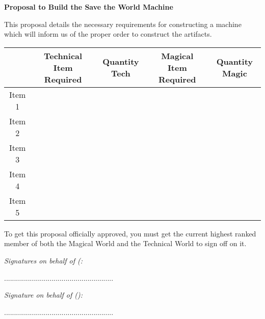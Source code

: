 \documentclass[white]{guildcamp3}
\begin{document}
\name{\wProposal{}} %
\large\textbf{Proposal to Build the Save the World Machine}  


This proposal details the necessary requirements for constructing a machine which will inform us of the proper order to construct the artifacts. 


\begin{tabular}{|c|c|c|c|c|}
	\hline \rule[-2ex]{0pt}{5.5ex}  & Technical Item Required & Quantity Tech & Magical Item Required & Quantity Magic \\ 
	\hline \rule[-2ex]{0pt}{5.5ex} Item 1 &  &  &  &  \\ 
	\hline \rule[-2ex]{0pt}{5.5ex} Item 2 &  &  &  &  \\ 
	\hline \rule[-2ex]{0pt}{5.5ex} Item 3 &  &  &  &  \\ 
	\hline \rule[-2ex]{0pt}{5.5ex} Item 4 &  &  &  &  \\ 
	\hline \rule[-2ex]{0pt}{5.5ex} Item 5 &  &  &  &  \\ 
	\hline 
\end{tabular} 

To get this proposal officially approved, you must get the current highest ranked member of both the Magical World and the Technical World to sign off on it. 



\emph{Signatures on behalf of \bTechWorld{} (\cPoliOne{\intro}: }
	
	.......................................................
	

\emph{Signature on behalf of \bMagicWorld{} (\cNobleOne{\intro}):}
	

	.......................................................


\end{document}
